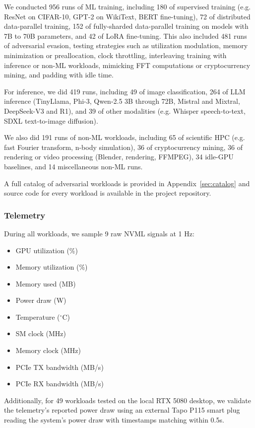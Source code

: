 We conducted 956 runs of ML training, including 180 of supervised training (e.g. ResNet \citep{he2016} on CIFAR-10, GPT-2 on WikiText, BERT \citep{devlin2019} fine-tuning), 72 of distributed data-parallel training, 152 of fully-sharded data-parallel training on models with 7B to 70B parameters, and 42 of LoRA fine-tuning. This also included 481 runs of adversarial evasion, testing strategies such as utilization modulation, memory minimization or preallocation, clock throttling, interleaving training with inference or non-ML workloads, mimicking FFT computations or cryptocurrency mining, and padding with idle time.

For inference, we did 419 runs, including 49 of image classification, 264 of LLM inference (TinyLlama, Phi-3, Qwen-2.5 3B through 72B, Mistral and Mixtral, DeepSeek-V3 and R1), and 39 of other modalities (e.g. Whisper speech-to-text, SDXL text-to-image diffusion).

We also did 191 runs of non-ML workloads, including 65 of scientific HPC (e.g. fast Fourier transform, n-body simulation), 36 of cryptocurrency mining, 36 of rendering or video processing (Blender, rendering, FFMPEG), 34 idle-GPU baselines, and 14 miscellaneous non-ML runs.

A full catalog of adversarial workloads is provided in Appendix~\ref{sec:catalog} and source code for every workload is available in the project repository.

\subsubsection{Telemetry}

During all workloads, we sample 9 raw NVML signals at 1 Hz:

\begin{itemize}\itemsep2pt
  \item GPU utilization (\%)
  \item Memory utilization (\%)
  \item Memory used (MB)
  \item Power draw (W)
  \item Temperature ($^\circ$C)
  \item SM clock (MHz)
  \item Memory clock (MHz)
  \item PCIe TX bandwidth (MB/s)
  \item PCIe RX bandwidth (MB/s)
\end{itemize}

Additionally, for 49 workloads tested on the local RTX 5080 desktop, we validate the telemetry's reported power draw using an external Tapo P115 smart plug reading the system's power draw with timestamps matching within 0.5s.

